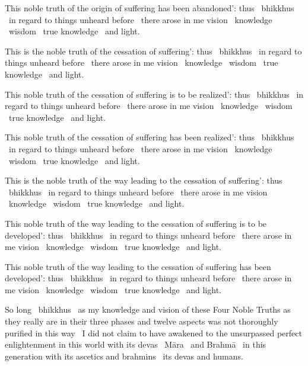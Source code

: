 This noble truth of the origin of suffering has been abandoned’: thus \breathmark\ bhikkhus \breathmark\ in regard to things unheard before \breathmark\ there arose in me vision \breathmark\ knowledge \breathmark\ wisdom \breathmark\ true knowledge \breathmark\ and light.

This is the noble truth of the cessation of suffering’: thus \breathmark\ bhikkhus \breathmark\ in regard to things unheard before \breathmark\ there arose in me vision \breathmark\ knowledge \breathmark\ wisdom \breathmark\ true knowledge \breathmark\ and light.

This noble truth of the cessation of suffering is to be realized’: thus \breathmark\ bhikkhus \breathmark\ in regard to things unheard before \breathmark\ there arose in me vision \breathmark\ knowledge \breathmark\ wisdom \breathmark\ true knowledge \breathmark\ and light.

This noble truth of the cessation of suffering has been realized’: thus \breathmark\ bhikkhus \breathmark\ in regard to things unheard before \breathmark\ there arose in me vision \breathmark\ knowledge \breathmark\ wisdom \breathmark\ true knowledge \breathmark\ and light.

This is the noble truth of the way leading to the cessation of suffering’: thus \breathmark\ bhikkhus \breathmark\ in regard to things unheard before \breathmark\ there arose in me vision \breathmark\ knowledge \breathmark\ wisdom \breathmark\ true knowledge \breathmark\ and light.

This noble truth of the way leading to the cessation of suffering is to be developed’: thus \breathmark\ bhikkhus \breathmark\ in regard to things unheard before \breathmark\ there arose in me vision \breathmark\ knowledge \breathmark\ wisdom \breathmark\ true knowledge \breathmark\ and light.

This noble truth of the way leading to the cessation of suffering has been developed’: thus \breathmark\ bhikkhus \breathmark\ in regard to things unheard before \breathmark\ there arose in me vision \breathmark\ knowledge \breathmark\ wisdom \breathmark\ true knowledge \breathmark\ and light.

So long \breathmark\ bhikkhus \breathmark\ as my knowledge and vision of these Four Noble Truths as they really are in their three phases and twelve aspects was not thoroughly purified in this way \breathmark\ I did not claim to have awakened to the unsurpassed perfect enlightenment in this world with its devas \breathmark\ Māra \breathmark\ and Brahmā \breathmark\ in this generation with its ascetics and brahmins \breathmark\ its devas and humans.

